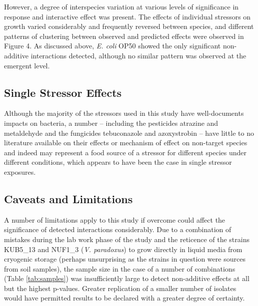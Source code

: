 \documentclass[final,1p,times]{elsarticle}
\begin{document}
However, a degree of interspecies variation at various levels of significance in response and interactive effect was present. The effects of individual stressors on growth varied considerably and frequently reversed between species, and different patterns of clustering between observed and predicted effects were observed in Figure 4. As discussed above, \textit{E. coli} OP50 showed the only significant non-additive interactions detected, although no similar pattern was observed at the emergent level. 

\subsection{Single Stressor Effects}
\label{S:4:2}

Although the majority of the stressors used in this study have well-documents impacts on bacteria, a number – including the pesticides atrazine and metaldehyde and the fungicides tebuconazole and azoxystrobin – have little to no literature available on their effects or mechanism of effect on non-target species and indeed may represent a food source of a stressor for different species under different conditions, which appears to have been the case in single stressor exposures.

\subsection{Caveats and Limitations}
\label{S:4:3}

A number of limitations apply to this study if overcome could affect the significance of detected interactions considerably.  Due to a combination of mistakes during the lab work phase of the study and the reticence of the strains KUB5\_13 and NUF1\_3 (\textit{V. paradoxus}) to grow directly in liquid media from cryogenic storage (perhaps unsurprising as the strains in question were sources from soil samples), the sample size in the case of a number of combinations (Table \ref{tab:samples}) was insufficiently large to detect non-additive effects at all but the highest p-values.  Greater replication of a smaller number of isolates would have permitted results to be declared with a greater degree of certainty. 
\end{document}
